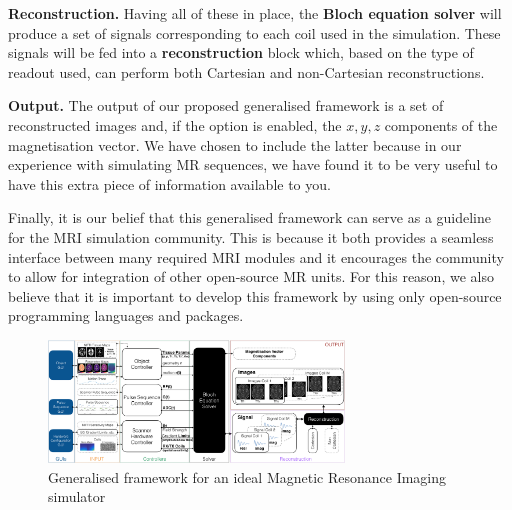 \hfill

\textbf{Reconstruction. } Having all of these in place, the \textbf{Bloch equation solver} will produce a set of signals corresponding to each coil used in the simulation.
These signals will be fed into a \textbf{reconstruction} block which, based on the type of readout used, can perform both Cartesian and non-Cartesian reconstructions.

\hfill

\textbf{Output. } The output of our proposed generalised framework is a set of reconstructed images and, if the option is enabled, the $x,y,z$ components of the magnetisation vector.
We have chosen to include the latter because in our experience with simulating MR sequences, we have found it to be very useful to have this extra piece of information available to you.

\hfill

Finally, it is our belief that this generalised framework can serve as a guideline for the MRI simulation community.
This is because it both provides a seamless interface between many required MRI modules and
it encourages the community to allow for integration of other open-source MR units.
For this reason, we also believe that it is important to develop this framework by using only open-source programming languages and packages.

\begin{figure}[ht]
    \centering
    \includegraphics[angle=90,width=0.7\textwidth, keepaspectratio]{images/mri/globalFramework}
    \caption{Generalised framework for an ideal Magnetic Resonance Imaging simulator}
    \label{fig:globalFramework}
\end{figure}